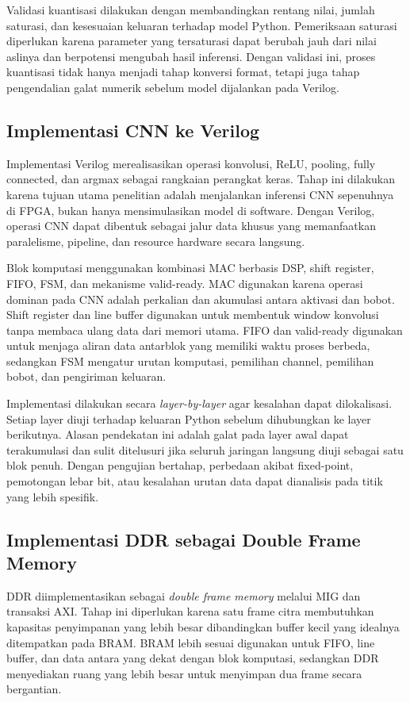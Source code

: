 	Validasi kuantisasi dilakukan dengan membandingkan rentang nilai, jumlah
	saturasi, dan kesesuaian keluaran terhadap model Python. Pemeriksaan saturasi
	diperlukan karena parameter yang tersaturasi dapat berubah jauh dari nilai
	aslinya dan berpotensi mengubah hasil inferensi. Dengan validasi ini, proses
	kuantisasi tidak hanya menjadi tahap konversi format, tetapi juga tahap
	pengendalian galat numerik sebelum model dijalankan pada Verilog.

    \subsection{Implementasi CNN ke Verilog}
	Implementasi Verilog merealisasikan operasi konvolusi, ReLU, pooling, fully
	connected, dan argmax sebagai rangkaian perangkat keras. Tahap ini dilakukan
	karena tujuan utama penelitian adalah menjalankan inferensi CNN sepenuhnya di
	FPGA, bukan hanya mensimulasikan model di software. Dengan Verilog, operasi
	CNN dapat dibentuk sebagai jalur data khusus yang memanfaatkan paralelisme,
	pipeline, dan resource hardware secara langsung.

	Blok komputasi menggunakan kombinasi MAC berbasis DSP, shift register, FIFO,
	FSM, dan mekanisme valid-ready. MAC digunakan karena operasi dominan pada CNN
	adalah perkalian dan akumulasi antara aktivasi dan bobot. Shift register dan
	line buffer digunakan untuk membentuk window konvolusi tanpa membaca ulang
	data dari memori utama. FIFO dan valid-ready digunakan untuk menjaga aliran
	data antarblok yang memiliki waktu proses berbeda, sedangkan FSM mengatur
	urutan komputasi, pemilihan channel, pemilihan bobot, dan pengiriman keluaran.

	Implementasi dilakukan secara \emph{layer-by-layer} agar kesalahan dapat dilokalisasi.
	Setiap layer diuji terhadap keluaran Python sebelum dihubungkan ke layer
	berikutnya. Alasan pendekatan ini adalah galat pada layer awal dapat
	terakumulasi dan sulit ditelusuri jika seluruh jaringan langsung diuji sebagai
	satu blok penuh. Dengan pengujian bertahap, perbedaan akibat fixed-point,
	pemotongan lebar bit, atau kesalahan urutan data dapat dianalisis pada titik
	yang lebih spesifik.

    \subsection{Implementasi DDR sebagai Double Frame Memory}
	DDR diimplementasikan sebagai \emph{double frame memory} melalui MIG dan
	transaksi AXI. Tahap ini diperlukan karena satu frame citra membutuhkan
	kapasitas penyimpanan yang lebih besar dibandingkan buffer kecil yang
	idealnya ditempatkan pada BRAM. BRAM lebih sesuai digunakan untuk FIFO,
	line buffer, dan data antara yang dekat dengan blok komputasi, sedangkan DDR
	menyediakan ruang yang lebih besar untuk menyimpan dua frame secara
	bergantian.

